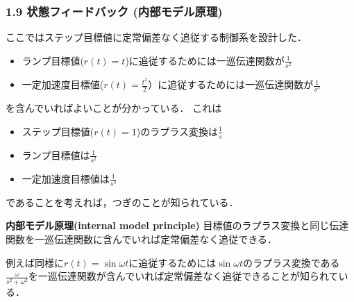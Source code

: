 \documentclass[10pt]{beamer}
\begin{document}
\begin{frame}[t]
\frametitle{1.9 状態フィードバック (内部モデル原理)}
ここではステップ目標値に定常偏差なく追従する制御系を設計した．\\
\begin{itemize}
  \item ランプ目標値($r(t)=t$)に追従するためには一巡伝達関数が$\frac{1}{s^2}$\\
  \item 一定加速度目標値($r(t)=\frac{t^2}{2}$）に追従するためには一巡伝達関数が$\frac{1}{s^3}$
\end{itemize}
を含んでいればよいことが分かっている．
これは\\
\begin{itemize}
  \item ステップ目標値($r(t)=1$)のラプラス変換は$\frac{1}{s}$
  \item ランプ目標値は$\frac{1}{s^2}$
  \item 一定加速度目標値は$\frac{1}{s^3}$
\end{itemize}
であることを考えれば，つぎのことが知られている．
\begin{block}{\bf 内部モデル原理(internal model principle)}
目標値のラプラス変換と同じ伝達関数を一巡伝達関数に含んでいれば定常偏差なく追従できる．
\end{block}
例えば同様に$r(t)= \sin \omega t$に追従するためには$\sin \omega t$のラプラス変換である$\frac{\omega}{s^2 + \omega^2}$を一巡伝達関数が含んでいれば定常偏差なく追従できることが知られている．
\end{frame}
\end{document}
